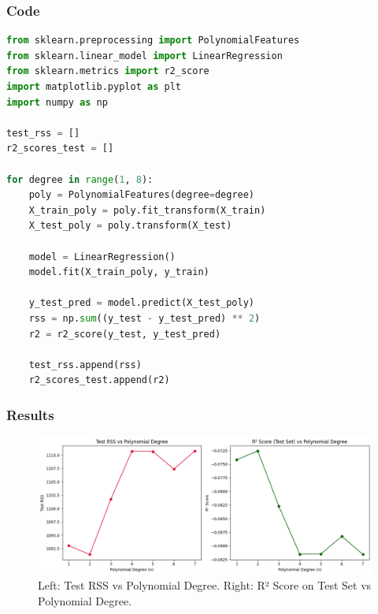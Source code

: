 \documentclass[12pt]{article}
\begin{document}
\subsubsection*{Code}
\begin{lstlisting}[language=Python, caption=Polynomial Regression: Test RSS]
from sklearn.preprocessing import PolynomialFeatures
from sklearn.linear_model import LinearRegression
from sklearn.metrics import r2_score
import matplotlib.pyplot as plt
import numpy as np

test_rss = []
r2_scores_test = []

for degree in range(1, 8):
    poly = PolynomialFeatures(degree=degree)
    X_train_poly = poly.fit_transform(X_train)
    X_test_poly = poly.transform(X_test)
    
    model = LinearRegression()
    model.fit(X_train_poly, y_train)
    
    y_test_pred = model.predict(X_test_poly)
    rss = np.sum((y_test - y_test_pred) ** 2)
    r2 = r2_score(y_test, y_test_pred)
    
    test_rss.append(rss)
    r2_scores_test.append(r2)
\end{lstlisting}

\subsubsection*{Results}
\begin{figure}[h]
\centering
\includegraphics[width=1.0\textwidth]{images/slr/carseat_test_rss_r2.png}
\caption{Left: Test RSS vs Polynomial Degree. Right: R² Score on Test Set vs Polynomial Degree.}
\end{figure}
\end{document}
